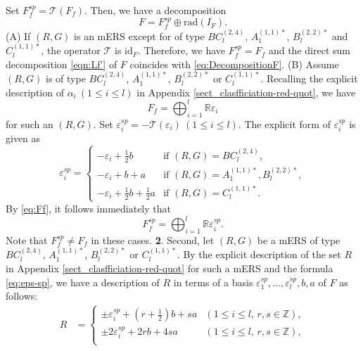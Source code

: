 \documentclass[11pt]{amsart}
\newcommand{\R}{\mathbb{R}}
\begin{document}
{{Set $F_f^{sp}=\mathcal{T}(F_f)$. Then, we have a decomposition 
\begin{equation}\label{eqn:Lf'}
F=F_f^{sp}\oplus\mathrm{rad}(I_F).
\end{equation}
(A) If $(R,G)$ is an mERS except for of type $BC_l^{(2,4)}$, $A_1^{(1,1)\ast}$, 
$B_l^{(2,2)\ast}$ and $C_l^{(1,1)\ast}$, the operator $\mathcal{T}$ is $\mathrm{id}_F$.
Therefore, we have $F_f^{sp}=F_f$ and the direct sum decomposition \eqref{eqn:Lf'} 
of $F$ coincides with \eqref{eq:DecompositionF}.
\vskip 3mm
\noindent 
(B) Assume $(R,G)$ is of type $BC_l^{(2,4)}$, $A_1^{(1,1)\ast}$, 
$B_l^{(2,2)\ast}$ or $C_l^{(1,1)\ast}$. Recalling the explicit description of 
$\alpha_i\ (1\leq i\leq l)$ in Appendix \ref{sect_clasfficiation-red-quot}, we have
\begin{equation}\label{eq:Ff}
F_f=\bigoplus_{i=1}^l \R \varepsilon_i
\end{equation}
for such an $(R,G)$.  
Set $\varepsilon_i^{sp}=-\mathcal{T}(\varepsilon_i)\ (1\leq i\leq l)$.
The explicit form of $\varepsilon_i^{sp}$ is given as
\begin{equation}\label{eq:eps-sp}
\varepsilon_i^{sp}=
\left\{\begin{array}{ll}
-\varepsilon_i+\tfrac12 b & \mbox{if } (R,G)=BC_l^{(2,4)},\\
-\varepsilon_i+b+a & \mbox{if } (R,G)=A_1^{(1,1)\ast}, B_l^{(2,2)\ast},\\
-\varepsilon_i+\tfrac12 b+\tfrac12 a & \mbox{if } (R,G)=C_l^{(1,1)\ast}.
\end{array}\right.
\end{equation}
By \eqref{eq:Ff}, it follows immediately that
\[F_f^{sp}=\bigoplus_{i=1}^l\R\varepsilon_i^{sp}.\]
Note that $F_f^{sp}\ne F_f$ in these cases.  
\vskip 5mm
\noindent
{\bf 2}. Second, 
let $(R,G)$ be a mERS of type  $BC_l^{(2,4)}$, $A_1^{(1,1)\ast}$, 
$B_l^{(2,2)\ast}$ or $C_l^{(1,1)\ast}$. By the explicit description of 
the set $R$ in Appendix \ref{sect_clasfficiation-red-quot} for such a mERS and 
the formula \eqref{eq:eps-sp}, we have a description of $R$ in terms of a basis
$\varepsilon_1^{sp},\ldots,\varepsilon_l^{sp},b,a$ of $F$ as follows:
\begin{equation}\label{eqn:R-*}
\begin{array}{lll}
R&\!\!=\left\{\!\!\begin{array}{ll}
\pm \varepsilon_i^{sp}+\left(r+\tfrac12\right)b+sa & (1\leq i\leq l,\, r,s\in\mathbb{Z}),\\
\pm 2\varepsilon_i^{sp}+2rb+4sa& (1\leq i\leq l,\, r,s\in\mathbb{Z}),\\

\end{array}
\end{array}
\end{equation}}}
\end{document}
